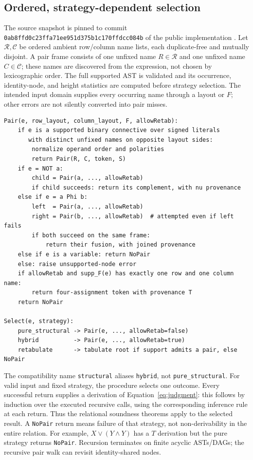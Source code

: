 \documentclass[10pt]{article}
\theoremstyle{plain}
\theoremstyle{definition}
\theoremstyle{remark}
\begin{document}
\subsection{Ordered, strategy-dependent selection}
\label{sec:selection}

The source snapshot is pinned to commit \texttt{0ab8ffd0c23ffa71ee951d375b1c170ffdcc084b} of the public implementation \cite{CompilerSnapshot2026}. Let $\mathcal R,\mathcal C$ be ordered ambient row/column name lists, each duplicate-free and mutually disjoint. A pair frame consists of one unfixed name $R\in\mathcal R$ and one unfixed name $C\in\mathcal C$; these names are discovered from the expression, not chosen by lexicographic order. The full supported AST is validated and its occurrence, identity-node, and height statistics are computed before strategy selection. The intended input domain supplies every occurring name through a layout or $F$; other errors are not silently converted into pair misses.

\begin{lstlisting}
Pair(e, row_layout, column_layout, F, allowRetab):
    if e is a supported binary connective over signed literals
       with distinct unfixed names on opposite layout sides:
        normalize operand order and polarities
        return Pair(R, C, token, S)
    if e = NOT a:
        child = Pair(a, ..., allowRetab)
        if child succeeds: return its complement, with nu provenance
    else if e = a Phi b:
        left  = Pair(a, ..., allowRetab)
        right = Pair(b, ..., allowRetab)  # attempted even if left fails
        if both succeed on the same frame:
            return their fusion, with joined provenance
    else if e is a variable: return NoPair
    else: raise unsupported-node error
    if allowRetab and supp_F(e) has exactly one row and one column name:
        return four-assignment token with provenance T
    return NoPair

Select(e, strategy):
    pure_structural -> Pair(e, ..., allowRetab=false)
    hybrid          -> Pair(e, ..., allowRetab=true)
    retabulate      -> tabulate root if support admits a pair, else NoPair
\end{lstlisting}

The compatibility name \texttt{structural} aliases \texttt{hybrid}, not \texttt{pure\_structural}. For valid input and fixed strategy, the procedure selects one outcome. Every successful return supplies a derivation of Equation~\eqref{eq:judgment}: this follows by induction over the executed recursive calls, using the corresponding inference rule at each return. Thus the relational soundness theorems apply to the selected result. A \texttt{NoPair} return means failure of that strategy, not non-derivability in the entire relation. For example, $X\lor(Y\land Y)$ has a $T$ derivation but the pure strategy returns \texttt{NoPair}. Recursion terminates on finite acyclic ASTs/DAGs; the recursive pair walk can revisit identity-shared nodes.
\end{document}
